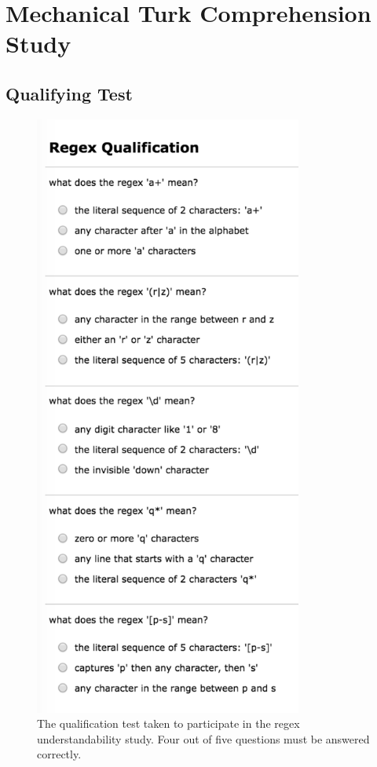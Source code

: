 \chapter{Mechanical Turk Comprehension Study}

\section*{Qualifying Test}

\begin{figure}[tb]
\centering
\includegraphics[height=20cm,keepaspectratio]{nontex/qualificationTest}
\vspace{-12pt}
\caption{The qualification test taken to participate in the regex understandability study.  Four out of five questions must be answered correctly.}
\vspace{-6pt}
\label{fig:qualTest}
\end{figure}

